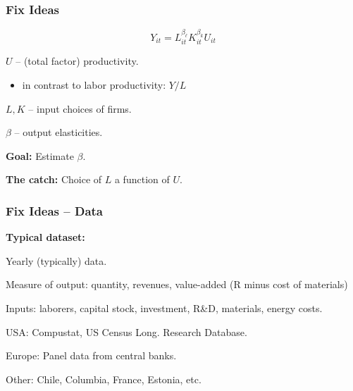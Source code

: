 \documentclass[11pt, aspectratio=169]{beamer}
\newcommand{\Skip}{\vspace{1em}}
\newenvironment{wideitemize}{\itemize\addtolength{\itemsep}{10pt}}{\enditemize}
\begin{document}
\begin{frame}[c]\frametitle{Fix Ideas}
   
\begin{equation}\label{eq:CobbDouglas}
	Y_{it} = L_{it}^{\beta_{\ell}}K_{it}^{\beta_k}U_{it}
\end{equation}


\Skip
\begin{wideitemize}
	\item $U$ -- (total factor) productivity.
	\begin{itemize}
		\item in contrast to labor productivity: $Y/L$
	\end{itemize}
	\item $L,K$ -- input choices of firms.	
	\item $\beta$ -- output elasticities.
\end{wideitemize}

\bigskip
\textbf{Goal:} Estimate $\beta$.

\bigskip
\textbf{The catch:} Choice of $L$ a function of $U$.
\end{frame}

\begin{frame}[c]\frametitle{Fix Ideas -- Data}

\textbf{Typical dataset:}
\begin{wideitemize}
	\item Yearly (typically) data.
	\item Measure of output: quantity, revenues, value-added (R minus cost of materials)
	\item Inputs: laborers, capital stock, investment, R\&D, materials, energy costs. 
	\item USA: Compustat, US Census Long. Research Database.
	\item Europe: Panel data from central banks. 
	\item Other: Chile, Columbia, France, Estonia, etc.
\end{wideitemize}


\end{frame}
\end{document}
